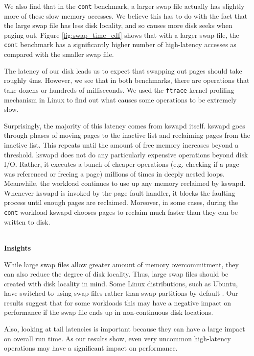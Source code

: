 \documentclass[twocolumn,11pt]{article}
\begin{document}
We also find that in the \texttt{cont} benchmark, a larger swap file actually has
slightly more of these slow memory accesses. We believe this has to do with the
fact that the large swap file has less disk locality, and so causes more disk
seeks when paging out. Figure \ref{fig:swap_time_cdf} shows that with a larger
swap file, the \texttt{cont} benchmark has a significantly higher number of
high-latency accesses as compared with the smaller swap file.

The latency of our disk leads us to expect that swapping out pages should take
roughly 4ms. However, we see that in both benchmarks, there are operations that
take dozens or hundreds of milliseconds. We used the \texttt{ftrace} kernel
profiling mechanism in Linux to find out what causes some operations to be
extremely slow.

Surprisingly, the majority of this latency comes from kswapd itself. kswapd goes
through phases of moving pages to the inactive list and reclaiming pages from
the inactive list. This repeats until the amount of free memory increases
beyond a threshold. kswapd does not do any particularly expensive operations
beyond disk I/O. Rather, it executes a bunch of cheaper operations (e.g.
checking if a page was referenced or freeing a page) millions of times in deeply
nested loops. Meanwhile, the workload continues to use up any memory reclaimed
by kswapd. Whenever kswapd is invoked by the page fault handler, it blocks the
faulting process until enough pages are reclaimed.  Moreover, in some cases,
during the \texttt{cont} workload kswapd chooses pages to reclaim much faster
than they can be written to disk.

~\\ \textbf{Insights} 

While large swap files allow greater amount of memory overcommitment, they can
also reduce the degree of disk locality. Thus, large swap files should be
created with disk locality in mind. Some Linux distributions, such as
Ubuntu, have switched to using swap files rather than swap partitions by default
\cite{swap_ubuntu}. Our results suggest that for some workloads this may have a
negative impact on performance if the swap file ends up in non-continuous disk
locations.


Also, looking at tail latencies is important because they can have a large
impact on overall run time. As our results show, even very uncommon high-latency
operations may have a significant impact on performance.
\end{document}
